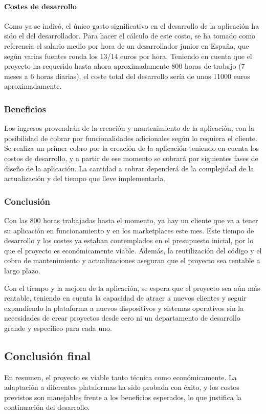 \paragraph{Costes de desarrollo}
\label{par:analisis_estudio_viabilidad_economica_costes_desarrollo}

Como ya se indicó, el único gasto significativo en el desarrollo de la aplicación ha sido el del desarrollador. Para hacer el 
cálculo de este costo, se ha tomado como referencia el salario medio por hora de un desarrollador junior en España, que según 
varias fuentes ronda los 13/14 euros por hora. Teniendo en cuenta que el proyecto ha requerido hasta ahora aproximadamente 800
horas de trabajo (7 meses a 6 horas diarias), el coste total del desarrollo sería de unos 11000 euros aproximadamente.

\subsubsection{Beneficios}
\label{subsubsec:analisis_estudio_viabilidad_economica_beneficios}

Los ingresos provendrán de la creación y mantenimiento de la aplicación, con la posibilidad de cobrar por 
funcionalidades adicionales según lo requiera el cliente. Se realiza un primer cobro por la creación de la
aplicación teniendo en cuenta los costos de desarrollo, y a partir de ese momento se cobrará por siguientes fases de diseño 
de la aplicación. La cantidad a cobrar dependerá de la complejidad de la actualización y del tiempo que lleve implementarla.

\subsubsection{Conclusión}
\label{subsubsec:analisis_estudio_viabilidad_economica_conclusion}

Con las 800 horas trabajadas hasta el momento, ya hay un cliente que va a tener su aplicación en funcionamiento y en los marketplaces
este mes. Este tiempo de desarrollo y los costes ya estaban contemplados en el presupuesto inicial, por lo que
el proyecto es económicamente viable. Además, la reutilización del código y el cobro de mantenimiento y actualizaciones
aseguran que el proyecto sea rentable a largo plazo.

Con el tiempo y la mejora de la aplicación, se espera que el proyecto sea aún más rentable, teniendo en cuenta la capacidad de atraer
a nuevos clientes y seguir expandiendo la plataforma a nuevos dispositivos y sistemas operativos sin la necesidades de crear 
proyectos desde cero ni un departamento de desarrollo grande y específico para cada uno.

\subsection{Conclusión final}   
\label{subsec:analisis_estudio_viabilidad_conclusion}

En resumen, el proyecto es viable tanto técnica como económicamente. La adaptación a diferentes plataformas 
ha sido probada con éxito, y los costos previstos son manejables frente a los beneficios esperados, lo que 
justifica la continuación del desarrollo.
